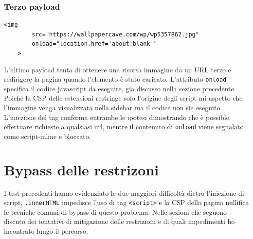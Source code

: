 \documentclass{sapthesis}
\newcommand{\code}[1]{\texttt{#1}}
\newcommand{\attr}[1]{\code{.#1}}
\newcommand{\tagHTML}[1]{\code{<#1>}}
\newcommand{\script}{\tagHTML{script}}
\begin{document}
        \subsubsection{Terzo payload}
            \begin{lstlisting}[numbers=none]
    <img 
        src="https://wallpapercave.com/wp/wp5357862.jpg" 
        onload="location.href='about:blank'" 
    >
\end{lstlisting}
            L'ultimo payload tenta di ottenere una risorsa immagine da un URL terzo e redirigere la pagina
            quando l'elemento è stato caricato. L'attributo \code{onload} specifica il codice javascript
            da eseguire, gia discusso nella sezione precedente. Poiché la CSP delle estensioni restringe 
            solo l'origine degli script mi aspetto che l'immagine venga visualizzata nella sidebar ma il
            codice non sia eseguito. L'iniezione del tag conferma entrambe le ipotesi dimostrando che
            è possible effettuare richieste a qualsiasi url, mentre il contenuto di \code{onload} viene segnalato
            come script-inline e bloccato.\\

    \section{Bypass delle restrizoni}
    \label{sec:attaccando-vuln-bypass}
        I test precedenti hanno evidenziato le due maggiori difficoltà dietro l'iniezione di script,
        \attr{innerHTML} impedisce l'uso di tag \script{} 
        e la CSP della pagina nullifica le tecniche comuni di bypass di questo problema. Nelle sezioni
        che seguono discuto dei tentativi di mitigazione delle restrizioni e di quali impedimenti ho
        incontrato lungo il percorso.
        
\end{document}
